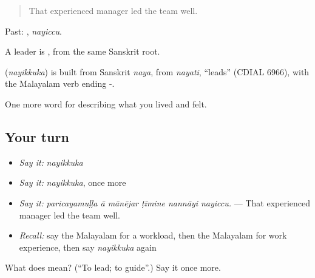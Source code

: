 \begin{quote}
That experienced manager led the team well.
\end{quote}

Past: , \emph{nayiccu}.

A leader is , from the same Sanskrit root.

\begin{cousinweb}
\textbf{} (\emph{nayikkuka}) is built from Sanskrit \emph{naya}, from \emph{nayati}, \textquotedblleft{}leads\textquotedblright{} (CDIAL 6966), with the Malayalam verb ending -.
\end{cousinweb}

\begin{grammarlens}[title={What you've built}]
One more word for describing what you lived and felt.
\end{grammarlens}

\subsection*{Your turn}
\begin{itemize}
\raggedright
  \item \emph{Say it:} \emph{nayikkuka}
  \item \emph{Say it:} \emph{nayikkuka}, once more
  \item \emph{Say it:} \emph{paricayamuḷḷa ā mānējar ṭīmine nannāyi nayiccu.} — That experienced manager led the team well.
  \item \emph{Recall:} say the Malayalam for a workload, then the Malayalam for work experience, then say \emph{nayikkuka} again
\end{itemize}

\begin{tcolorbox}[breakable,colback=teal!4,colframe=teal!35!black,title={Before you move on}]
What does  mean? (\textquotedblleft{}To lead; to guide\textquotedblright{}.) Say it once more.
\end{tcolorbox}
